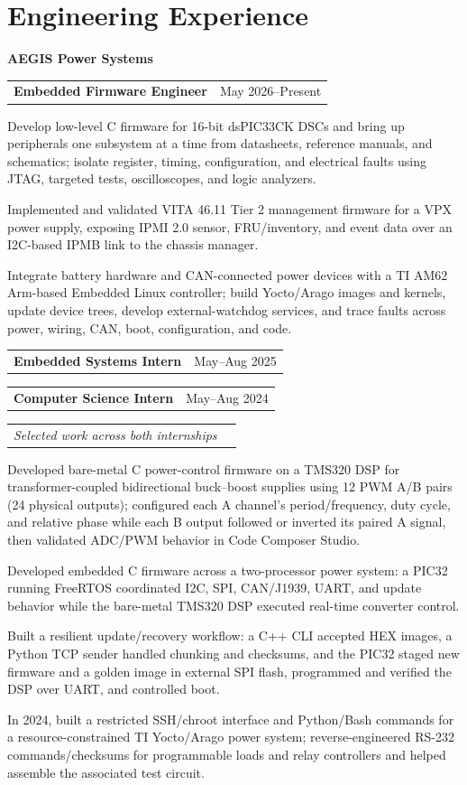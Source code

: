 \documentclass[10pt,letterpaper]{article}
\makeatletter
\newcommand{\companyheader}[1]{%
  {\fontsize{10.4}{10.8}\selectfont\bfseries #1}\par\vspace{-0.03cm}
}
\newcommand{\roleentry}[2]{%
  \begin{tabularx}{\textwidth}{@{}X>{\raggedleft\arraybackslash}p{2.40in}@{}}
    \textbf{#1} & #2
  \end{tabularx}\vspace{-0.075cm}
}
\newcommand{\descriptorentry}[1]{%
  \begin{tabularx}{\textwidth}{@{}X>{\raggedleft\arraybackslash}p{2.40in}@{}}
    \textit{#1} &
  \end{tabularx}\vspace{-0.075cm}
}
\makeatother
\begin{document}
\section{Engineering Experience}
\companyheader{AEGIS Power Systems}
\roleentry{Embedded Firmware Engineer}{May 2026--Present}
\begin{resumebullets}
  \item Develop low-level C firmware for 16-bit dsPIC33CK DSCs and bring up peripherals one subsystem at a time from datasheets, reference manuals, and schematics; isolate register, timing, configuration, and electrical faults using JTAG, targeted tests, oscilloscopes, and logic analyzers.
  \item Implemented and validated VITA 46.11 Tier 2 management firmware for a VPX power supply, exposing IPMI 2.0 sensor, FRU/inventory, and event data over an I2C-based IPMB link to the chassis manager.
  \item Integrate battery hardware and CAN-connected power devices with a TI AM62 Arm-based Embedded Linux controller; build Yocto/Arago images and kernels, update device trees, develop external-watchdog services, and trace faults across power, wiring, CAN, boot, configuration, and code.
\end{resumebullets}

\roleentry{Embedded Systems Intern}{May--Aug 2025}
\roleentry{Computer Science Intern}{May--Aug 2024}
\descriptorentry{Selected work across both internships}
\begin{resumebullets}
  \item Developed bare-metal C power-control firmware on a TMS320 DSP for transformer-coupled bidirectional buck--boost supplies using 12 PWM A/B pairs (24 physical outputs); configured each A channel's period/frequency, duty cycle, and relative phase while each B output followed or inverted its paired A signal, then validated ADC/PWM behavior in Code Composer Studio.
  \item Developed embedded C firmware across a two-processor power system: a PIC32 running FreeRTOS coordinated I2C, SPI, CAN/J1939, UART, and update behavior while the bare-metal TMS320 DSP executed real-time converter control.
  \item Built a resilient update/recovery workflow: a C++ CLI accepted HEX images, a Python TCP sender handled chunking and checksums, and the PIC32 staged new firmware and a golden image in external SPI flash, programmed and verified the DSP over UART, and controlled boot.
  \item In 2024, built a restricted SSH/chroot interface and Python/Bash commands for a resource-constrained TI Yocto/Arago power system; reverse-engineered RS-232 commands/checksums for programmable loads and relay controllers and helped assemble the associated test circuit.
\end{resumebullets}
\end{document}
